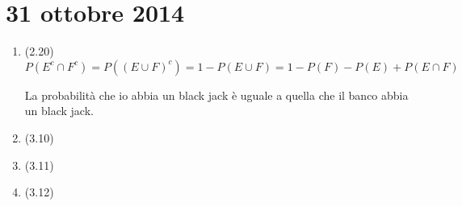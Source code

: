\section{31 ottobre 2014}

\begin{enumerate}
    \item (2.20) $P(E^{c} \cap F^{c}) = P((E \cup F)^{c}) = 1 - P(E \cup F) = 1 - P(F) - P(E) + P(E \cap F)$

    La probabilit\`a che io abbia un black jack \`e uguale a quella che il banco abbia un black jack.
    \item (3.10)
    \item (3.11)
    \item (3.12)
\end{enumerate}